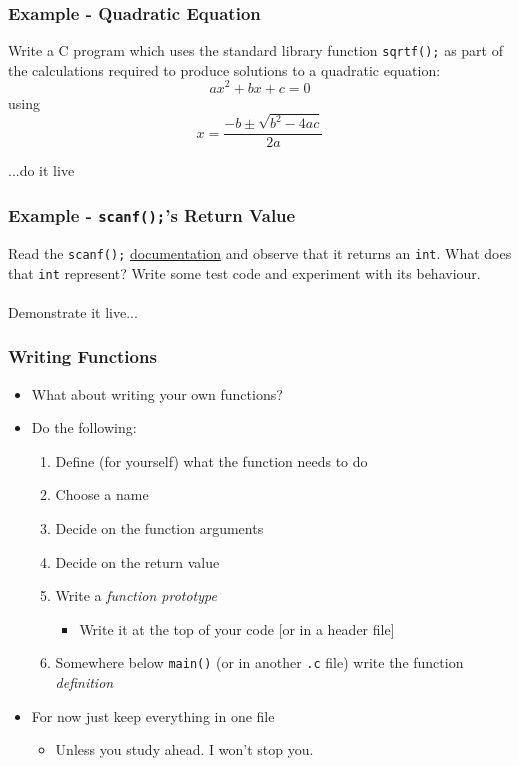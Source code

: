 \documentclass[14pt]{beamer}
\begin{document}
\begin{frame}
\frametitle{Example - Quadratic Equation}
Write a C program which uses the standard library function \texttt{sqrtf();} as part of the calculations required to produce solutions to a quadratic equation:
\begin{equation}
ax^2 + bx + c = 0
\end{equation}
using
\begin{equation}
x = \frac{-b \pm \sqrt{b^2 - 4ac}}{2a}
\end{equation}
\end{frame}

\begin{frame}
\begin{center}
...do it live
\end{center}
\end{frame}

\begin{frame}
\frametitle{Example - \texttt{scanf();}'s Return Value}
Read the \texttt{scanf();} \underline{\href{http://man7.org/linux/man-pages/man3/scanf.3.html}{documentation}} and observe that it returns an \texttt{int}. What does that \texttt{int} represent? Write some test code and experiment with its behaviour.
\\~\\
Demonstrate it live...
\end{frame}

\begin{frame}
\frametitle{Writing Functions}
\begin{itemize}
\item What about writing your own functions?
\pause
\item Do the following:
	\begin{enumerate}
		\item Define (for yourself) what the function needs to do
		\pause
		\item Choose a name
		\pause
		\item Decide on the function arguments
		\pause
		\item Decide on the return value
		\pause
		\item Write a \textit{function prototype}
			\begin{itemize}
				\item Write it at the top of your code [or in a header file]
			\end{itemize}
		\pause
		\item Somewhere below \texttt{main()} (or in another \texttt{.c} file) write the function \textit{definition}
	\end{enumerate}
\pause
\item For now just keep everything in one file
	\begin{itemize}
		\item Unless you study ahead. I won't stop you.
	\end{itemize}
\end{itemize}
\end{frame}
\end{document}
